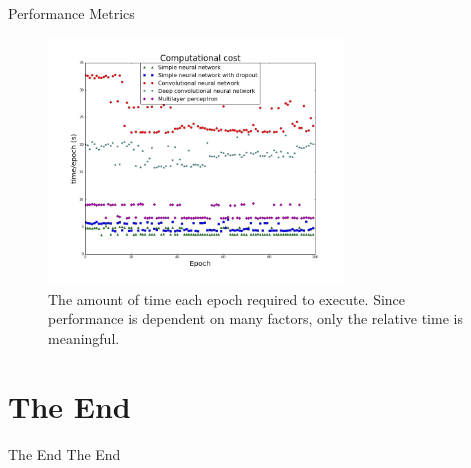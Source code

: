 \begin{frame}[plain]{Performance Metrics}
\begin{figure}
\includegraphics[width = 0.7\textwidth]{comp}
\caption{The amount of time each epoch required to execute. Since performance is dependent on many factors, only the relative time is meaningful.}
\end{figure}
\end{frame}

\section{The End}
\begin{frame}[c]{The End}\centering
\huge The End
\end{frame}

